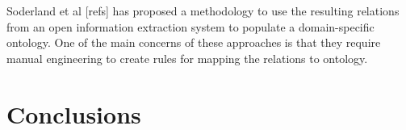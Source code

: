 \documentclass{llncs}
\begin{document}
Soderland et al [refs] has proposed a methodology to use the resulting relations from an open information extraction system to populate a domain-specific ontology. One of the main concerns of these approaches is that they require manual engineering to create rules for mapping the relations to ontology.

\section{Conclusions}


\renewcommand\bibname{References}

{\fontsize{9}{10}\selectfont


}
\end{document}
